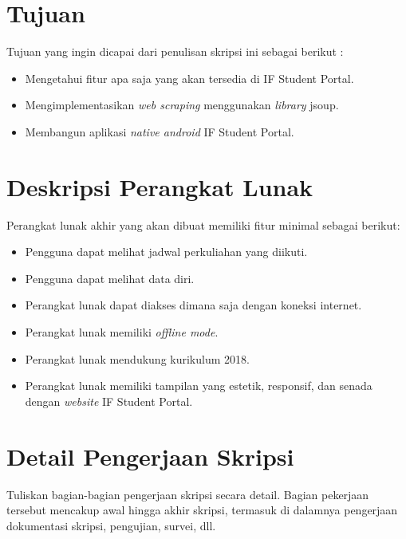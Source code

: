 \documentclass[a4paper,twoside]{article}
\begin{document}
\section{Tujuan}
Tujuan yang ingin dicapai dari penulisan skripsi ini sebagai berikut :
\begin{itemize}
    \item Mengetahui fitur apa saja yang akan tersedia di IF Student Portal.
    \item Mengimplementasikan \textit{web scraping} menggunakan \textit{library} jsoup.
    \item Membangun aplikasi \textit{native android} IF Student Portal.
    
\end{itemize}

\section{Deskripsi Perangkat Lunak}

Perangkat lunak akhir yang akan dibuat memiliki fitur minimal sebagai berikut:
\begin{itemize}
	\item Pengguna dapat melihat jadwal perkuliahan yang diikuti.
	\item Pengguna dapat melihat data diri.
	\item Perangkat lunak dapat diakses dimana saja dengan koneksi internet.
	\item Perangkat lunak memiliki \textit{offline mode}.
	\item Perangkat lunak mendukung kurikulum 2018.
	\item Perangkat lunak memiliki tampilan yang estetik, responsif, dan senada dengan \textit{website} IF Student Portal.
\end{itemize}

\section{Detail Pengerjaan Skripsi}
Tuliskan bagian-bagian pengerjaan skripsi secara detail. Bagian pekerjaan tersebut mencakup awal hingga akhir skripsi, termasuk di dalamnya pengerjaan dokumentasi skripsi, pengujian, survei, dll.
\end{document}
